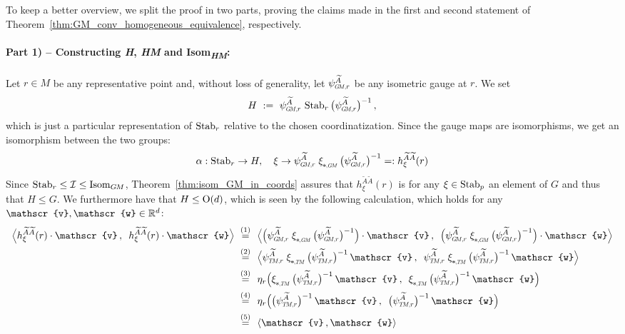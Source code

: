 To keep a better overview, we split the proof in two parts, proving the claims made in the first and second statement of Theorem~\ref{thm:GM_conv_homogeneous_equivalence}, respectively.

\paragraph{Part 1) -- Constructing \textit{H}, \textit{HM} and Isom\textsubscript{\textit{HM}}:}
Let $r\in M$ be any representative point and, without loss of generality, let $\psiGMr^{\widetilde{A}}$ be any isometric gauge at $r$.
We set
\begin{align}
    H\ :=\ \psiGMr^{\widetilde{A}} \,\Stab{r} \big(\psiGMr^{\widetilde{A}} \big)^{-1} \,,
\end{align}
which is just a particular representation of $\operatorname{Stab}_{r}$ relative to the chosen coordinatization.
Since the gauge maps are isomorphisms, we get an isomorphism between the two groups:
\begin{align}\label{eq:stabr_H_iso}
    \alpha: \Stab{r} \to H,\ \ \ \xi \to \psiGMr^{\widetilde{A}} \;\dxiGM\, \big(\psiGMr^{\widetilde{A}} \big)^{-1} =: h_\xi^{\widetilde{A}\widetilde{A}}(r)
\end{align}
Since $\operatorname{Stab}_{r} \leq \mathcal{I} \leq \operatorname{Isom}_{G\mkern-1.4muM}$, Theorem~\ref{thm:isom_GM_in_coords} assures that $h_\xi^{\widetilde{A}\widetilde{A}}(r)$ is for any $\xi \in \operatorname{Stab}_{p}$ an element of $G$ and thus that $H \leq G$.
We furthermore have that $H\leq\operatorname{O}(d)$, which is seen by the following calculation, which holds for any $\mathscr{v},\mathscr{w} \in \R^d$:
\begin{align}
    \pig\langle h_\xi^{\widetilde{A}\widetilde{A}}(r) \cdot\mathscr{v} \,,\,\ h_\xi^{\widetilde{A}\widetilde{A}}(r) \cdot\mathscr{w} \pig\rangle
    \ \overset{(1)}{=}&\ \ \pig\langle \pig( \psiGMr^{\widetilde{A}} \;\dxiGM\, \big(\psiGMr^{\widetilde{A}} \big)^{-1} \pig) \cdot \mathscr{v} \,,\,\ \pig( \psiGMr^{\widetilde{A}} \;\dxiGM\, \big(\psiGMr^{\widetilde{A}} \big)^{-1} \pig) \cdot \mathscr{w} \pig\rangle \notag \\
    \ \overset{(2)}{=}&\ \ \pig\langle \psiTMr^{\widetilde{A}} \;\dxiTM\, \big(\psiTMr^{\widetilde{A}} \big)^{-1} \,\mathscr{v} \,,\,\ \psiTMr^{\widetilde{A}} \;\dxiTM\, \big(\psiTMr^{\widetilde{A}} \big)^{-1} \,\mathscr{w} \pig\rangle \notag \\
    \ \overset{(3)}{=}&\ \ \eta_r\pig( \dxiTM\, \big(\psiTMr^{\widetilde{A}} \big)^{-1} \,\mathscr{v} \,,\,\ \dxiTM\, \big(\psiTMr^{\widetilde{A}} \big)^{-1} \,\mathscr{w} \pig) \notag \\
    \ \overset{(4)}{=}&\ \ \eta_r\pig( \big(\psiTMr^{\widetilde{A}} \big)^{-1} \,\mathscr{v} \,,\,\ \big(\psiTMr^{\widetilde{A}} \big)^{-1} \,\mathscr{w} \pig) \notag \\
    \ \overset{(5)}{=}&\ \ \langle \mathscr{v} \,, \mathscr{w} \rangle
\end{align}
